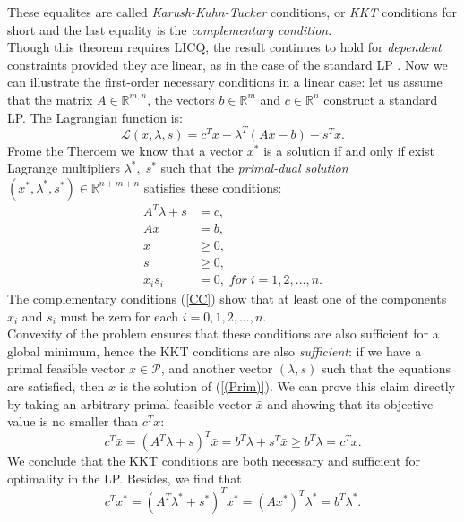 \documentclass[a4paper,10 pt,titlepage,twoside]{book}
\theoremstyle{plain}
\theoremstyle{definition}
\theoremstyle{remark}
\begin{document}
These equalites are called \textit{Karush-Kuhn-Tucker} conditions, or \textit{KKT} conditions for short and the last equality is the \textit{complementary condition}.\\ Though this theorem requires LICQ, the result continues to hold for \textit{dependent} constraints provided they are linear, as in the case of the standard LP \cite{W}. Now we can illustrate the first-order necessary conditions in a linear case: let us assume that the matrix $A\in\mathbb{R}^{m,n}$, the vectors $b\in\mathbb{R}^{m}$ and $c\in\mathbb{R}^{n}$ construct a standard LP. The Lagrangian function is:\\
\begin{equation}\label{Lagrangian}
\mathcal{L}(x,\lambda,s)=c^{T}x-\lambda^{T}\left(Ax-b\right)-s^{T}x.
\end{equation}
Frome the Theroem we know that a vector $x^{*}$ is a solution if and only if exist Lagrange multipliers $\lambda^{*},\;s^{*}$ such that the \textit{primal-dual solution} $\left( x^{*},\lambda^{*},s^{*}\right)\in\mathbb{R}^{n+m+n}$ satisfies these conditions: 
\begin{align*}
A^{T}\lambda+s&=c,\tag{2.5a}\label{DF}\\ 
Ax&=b,\tag{2.5b}\label{PF}\\ 
x&\geq 0,\tag{2.5c}\\
s&\geq 0,\tag{2.5d}\\
x_{i}s_{i}&=0,\; for\;i= 1,2,...,n.\label{CC} \tag{2.5e}
\end{align*} 
The complementary conditions (\ref{CC}) show that at least one of the components $x_{i}$ and $s_{i}$ must be zero for each $i=0,1,2,...,n$.\\
 Convexity of the problem ensures that these conditions are also sufficient for a global minimum, hence the KKT conditions are also \textit{sufficient}: if we have a primal feasible vector $x\in\mathcal{P}$, and another vector $(\lambda, s)$ such that the equations are satisfied, then $x$ is the solution of (\ref{(Prim)}). We can prove this claim directly by taking an arbitrary primal feasible vector $\bar{x}$ and showing that its objective value is no smaller than $c^{T}x$:
\begin{equation*}
c^{T}\bar{x}=(A^{T}\lambda+s)^{T}\bar{x}=b^{T}\lambda+s^{T}\bar{x}\geq b^{T}\lambda= c^{T}x.
\end{equation*}
We conclude that the KKT conditions are both necessary and sufficient for optimality in the LP. Besides, we find that
\begin{equation*}
	c^{T}x^{*}=\left(A^{T}\lambda^{*}+s^{*}\right)^{T}x^{*}=\left(Ax^{*}\right)^{T}\lambda^{*}=b^{T}\lambda^{*}.
\end{equation*}
\end{document}
